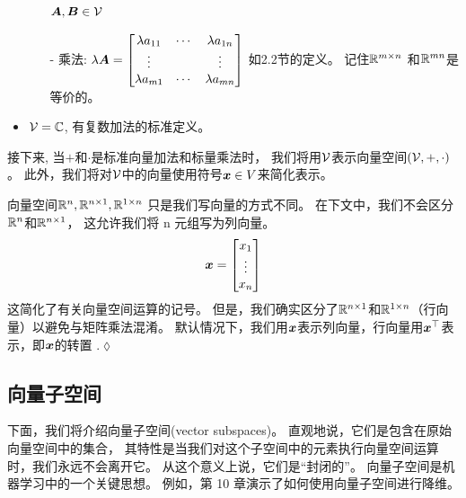 \begin{example}[向量空间]
\begin{itemize}
\begin{itemize}
                           $\boldsymbol{A}, \boldsymbol{B} \in \mathcal{V}$
                  \item[-] 乘法:
                           $
                           \lambda\boldsymbol{A} =
                           \begin{bmatrix}
                               \lambda a_{11} & \cdots& \lambda a_{1n} \\
                               \vdots & & \vdots \\
                               \lambda a_{m1} & \cdots& \lambda a_{mn} \\
                           \end{bmatrix}
                           $
                           如2.2节的定义。
                           记住$\mathbb{R}^{m \times n}$ 和$\mathbb{R}^{mn}$是等价的。
              \end{itemize}
        \item $\mathcal{V} = \mathbb{C}$, 有复数加法的标准定义。
    \end{itemize}
\end{example}
\begin{remark}
    接下来,
    当$+$和$\cdot$是标准向量加法和标量乘法时，
    我们将用$\mathcal{V}$表示向量空间$(\mathcal{V}, +, \cdot)$。
    此外，我们将对$\mathcal{V}$中的向量使用符号$\boldsymbol{x} \in V$来简化表示。
\end{remark}
\begin{remark}
    向量空间$\mathbb{R}^n, \mathbb{R}^{n\times 1}, \mathbb{R}^{1 \times n}$
    只是我们写向量的方式不同。
    在下文中，我们不会区分$\mathbb{R}^n$和$\mathbb{R}^{n\times 1}$，
    这允许我们将 n 元组写为列向量。
    \begin{equation}
        \boldsymbol{x} =
        \begin{bmatrix}
            x_1 \\ \vdots \\ x_n
        \end{bmatrix}
    \end{equation}
    这简化了有关向量空间运算的记号。
    但是，我们确实区分了$\mathbb{R}^{n \times 1}$和$\mathbb{R}^{1\times n}$（行向量）以避免与矩阵乘法混淆。
    默认情况下，我们用$\boldsymbol{x}$表示列向量，行向量用$\boldsymbol{x}^\top$表示，即$\boldsymbol{x}$的转置 .\hfill $\lozenge$
\end{remark}

\subsection{向量子空间}

下面，我们将介绍向量子空间(vector subspaces)。
直观地说，它们是包含在原始向量空间中的集合，
其特性是当我们对这个子空间中的元素执行向量空间运算时，我们永远不会离开它。
从这个意义上说，它们是“封闭的”。 向量子空间是机器学习中的一个关键思想。
例如，第 10 章演示了如何使用向量子空间进行降维。

